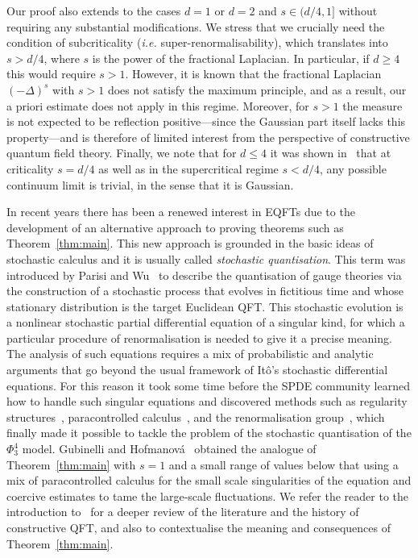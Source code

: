 \documentclass{article}
\numberwithin{equation}{section}
\theoremstyle{plain}
\theoremstyle{definition}
\begin{document}
Our proof also extends to the cases $d = 1$ or $d = 2$ and $s
\in (d / 4, 1]$ without requiring any substantial modifications. We stress
that we crucially need the condition of subcriticality (\textit{i.e.}
super-renormalisability), which translates into $s > d / 4$, where $s$ is the
power of the fractional Laplacian. In particular, if $d \geqslant 4$ this
would require $s > 1$. However, it is known that the fractional Laplacian $(-
\Delta)^s$ with $s > 1$ does not satisfy the maximum principle, and as a
result, our a priori estimate does not apply in this regime. Moreover, for $s
> 1$ the measure is not expected to be reflection positive---since the
Gaussian part itself lacks this property---and is therefore of limited
interest from the perspective of constructive quantum field theory. Finally,
we note that for $d \leqslant 4$ it was shown
in~{\cite{panisTrivialityScalingLimits2025}} that at criticality $s = d /
4$ as well as in the supercritical regime $s < d / 4$, any possible continuum
limit is trivial, in the sense that it is Gaussian.

In recent years there has been a renewed interest in EQFTs due to the
development of an alternative approach to proving theorems such as
Theorem~\ref{thm:main}. This new approach is grounded in the basic ideas of
stochastic calculus and it is usually called \textit{stochastic
quantisation}. This term was introduced by Parisi and
Wu~{\cite{parisi_perturbation_1981}} to describe the quantisation of gauge
theories via the construction of a stochastic process that evolves in fictitious
time and whose stationary distribution is the target Euclidean QFT. This
stochastic evolution is a nonlinear stochastic partial differential equation
of a singular kind, for which a particular procedure of renormalisation is
needed to give it a precise meaning. The analysis of such equations requires a
mix of probabilistic and analytic arguments that go beyond the usual framework of
It\^o's stochastic differential equations. For this reason it took some time
before the SPDE community learned how to handle such singular equations and
discovered methods such as regularity structures~{\cite{hairer2014theory}},
paracontrolled
calculus~{\cite{gubinelli2015paracontrolled,catellierParacontrolledDistributions3dimensional2018}},
and the renormalisation group~{\cite{kupiainen2016renormalization}}, which finally
made it possible to tackle the problem of the stochastic quantisation of the $\Phi^4_3$
model. Gubinelli and
Hofmanov{\'a}~{\cite{GH21}} obtained the
analogue of Theorem~\ref{thm:main} with $s = 1$ and a small range of values
below that using a mix of paracontrolled calculus for the small scale
singularities of the equation and coercive estimates to tame the large-scale
fluctuations. We refer the reader to the introduction
to~{\cite{GH21}} for a deeper review of the
literature and the history of constructive QFT, and also to contextualise the
meaning and consequences of Theorem~\ref{thm:main}.
\end{document}
